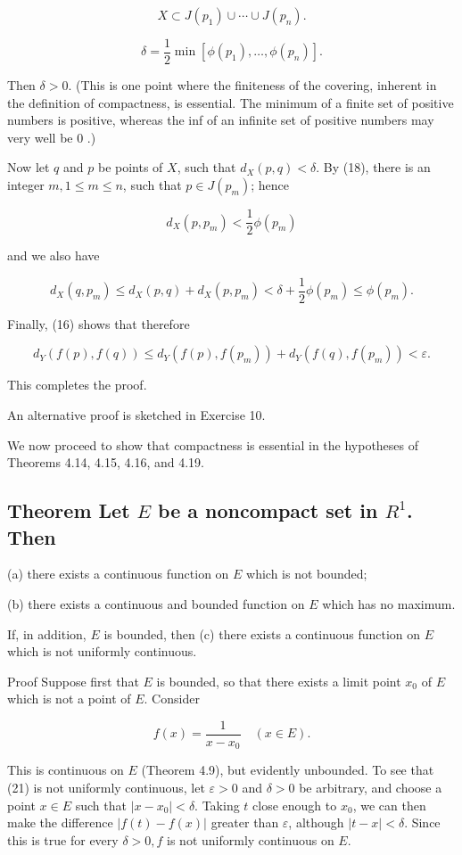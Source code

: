 \documentclass[10pt]{article}
\begin{document}
$$
X \subset J\left(p_{1}\right) \cup \cdots \cup J\left(p_{n}\right) .
$$

$$
\delta=\frac{1}{2} \min \left[\phi\left(p_{1}\right), \ldots, \phi\left(p_{n}\right)\right] .
$$

Then $\delta>0$. (This is one point where the finiteness of the covering, inherent in the definition of compactness, is essential. The minimum of a finite set of positive numbers is positive, whereas the inf of an infinite set of positive numbers may very well be 0 .)

Now let $q$ and $p$ be points of $X$, such that $d_{X}(p, q)<\delta$. By (18), there is an integer $m, 1 \leq m \leq n$, such that $p \in J\left(p_{m}\right)$; hence

$$
d_{X}\left(p, p_{m}\right)<\frac{1}{2} \phi\left(p_{m}\right)
$$

and we also have

$$
d_{X}\left(q, p_{m}\right) \leq d_{X}(p, q)+d_{X}\left(p, p_{m}\right)<\delta+\frac{1}{2} \phi\left(p_{m}\right) \leq \phi\left(p_{m}\right) .
$$

Finally, (16) shows that therefore

$$
d_{Y}(f(p), f(q)) \leq d_{Y}\left(f(p), f\left(p_{m}\right)\right)+d_{Y}\left(f(q), f\left(p_{m}\right)\right)<\varepsilon .
$$

This completes the proof.

An alternative proof is sketched in Exercise 10.

We now proceed to show that compactness is essential in the hypotheses of Theorems 4.14, 4.15, 4.16, and 4.19.

\subsection{Theorem Let $E$ be a noncompact set in $R^{1}$. Then}
(a) there exists a continuous function on $E$ which is not bounded;

(b) there exists a continuous and bounded function on $E$ which has no maximum.

If, in addition, $E$ is bounded, then (c) there exists a continuous function on $E$ which is not uniformly continuous.

Proof Suppose first that $E$ is bounded, so that there exists a limit point $x_{0}$ of $E$ which is not a point of $E$. Consider

$$
f(x)=\frac{1}{x-x_{0}} \quad(x \in E) .
$$

This is continuous on $E$ (Theorem 4.9), but evidently unbounded. To see that (21) is not uniformly continuous, let $\varepsilon>0$ and $\delta>0$ be arbitrary, and choose a point $x \in E$ such that $\left|x-x_{0}\right|<\delta$. Taking $t$ close enough to $x_{0}$, we can then make the difference $|f(t)-f(x)|$ greater than $\varepsilon$, although $|t-x|<\delta$. Since this is true for every $\delta>0, f$ is not uniformly continuous on $E$.
\end{document}
